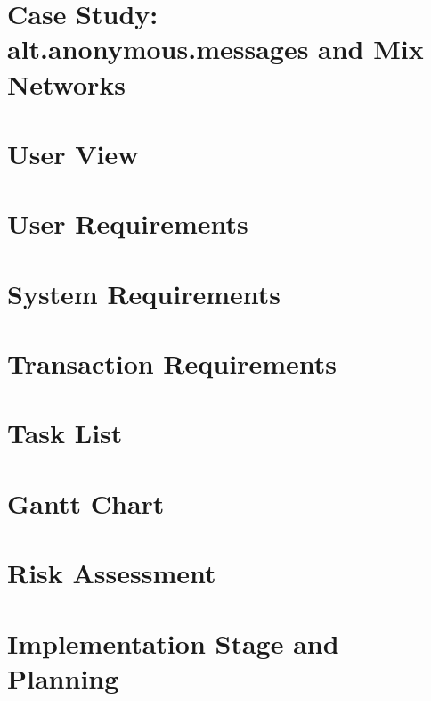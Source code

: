 \chapter{Case Study: alt.anonymous.messages and Mix Networks}


\chapter{User View}


\chapter{User Requirements}


\chapter{System Requirements}


\chapter{Transaction Requirements}


\chapter{Task List}


\chapter{Gantt Chart}


\chapter{Risk Assessment}


\chapter{Implementation Stage and Planning}

